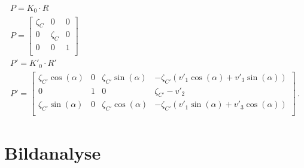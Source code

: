 \begin{gather}
P = K_0\cdot R \\
P =
\begin{bmatrix}
\zeta_{C}&0&0\\
0&\zeta_{C}&0\\
0&0&1\\
\end{bmatrix}\\
P' = K'_0 \cdot R'\\
P' =
\begin{bmatrix}
\zeta_{C'} \cos(\alpha)&0&\zeta_{C'} \sin(\alpha)&-\zeta_{C'} (v'_1\cos(\alpha)+v'_3\sin(\alpha) )\\
0&1&0&\zeta_{C'}-v'_2\\
\zeta_{C'}\sin(\alpha)&0&\zeta_{C'}\cos(\alpha)&-\zeta_{C'}(v'_1\sin(\alpha)+v'_3\cos(\alpha))\\
\end{bmatrix} \, .
\end{gather}



%




\section{Bildanalyse}
\label{sec:MinimalFun}

